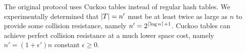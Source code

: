 \begin{remark}
The original protocol uses Cuckoo tables instead of regular hash tables. We experimentally determined that $\left\lvert T\right\rvert = n'$ must be at least twice as large as $n$ to provide some collision resistance, namely $n' = 2^{\left\lceil \log n \right\rceil +1}$. Cuckoo tables can achieve perfect collision resistance at a much lower space cost, namely $n' = (1+\epsilon')n$  constant $\epsilon \geq 0$.
\end{remark}


